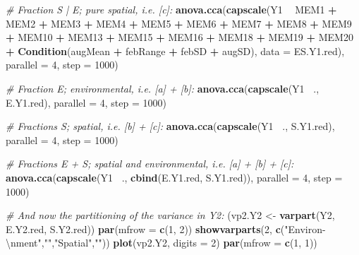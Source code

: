 \documentclass[10pt,A4,]{article}
\newenvironment{Shaded}{\begin{snugshade}}{\end{snugshade}}
\newcommand{\KeywordTok}[1]{\textcolor[rgb]{0.13,0.29,0.53}{\textbf{#1}}}
\newcommand{\DataTypeTok}[1]{\textcolor[rgb]{0.13,0.29,0.53}{#1}}
\newcommand{\DecValTok}[1]{\textcolor[rgb]{0.00,0.00,0.81}{#1}}
\newcommand{\CharTok}[1]{\textcolor[rgb]{0.31,0.60,0.02}{#1}}
\newcommand{\StringTok}[1]{\textcolor[rgb]{0.31,0.60,0.02}{#1}}
\newcommand{\CommentTok}[1]{\textcolor[rgb]{0.56,0.35,0.01}{\textit{#1}}}
\newcommand{\OperatorTok}[1]{\textcolor[rgb]{0.81,0.36,0.00}{\textbf{#1}}}
\newcommand{\NormalTok}[1]{#1}
\begin{document}
\begin{Shaded}
\begin{Highlighting}[]
\CommentTok{# Fraction S | E; pure spatial, i.e. [c]:}
\KeywordTok{anova.cca}\NormalTok{(}\KeywordTok{capscale}\NormalTok{(Y1 }\OperatorTok{~}\StringTok{ }\NormalTok{MEM1 }\OperatorTok{+}\StringTok{ }\NormalTok{MEM2 }\OperatorTok{+}\StringTok{ }\NormalTok{MEM3 }\OperatorTok{+}\StringTok{ }\NormalTok{MEM4 }\OperatorTok{+}\StringTok{ }\NormalTok{MEM5 }\OperatorTok{+}
\StringTok{                              }\NormalTok{MEM6 }\OperatorTok{+}\StringTok{ }\NormalTok{MEM7 }\OperatorTok{+}\StringTok{ }\NormalTok{MEM8 }\OperatorTok{+}\StringTok{ }\NormalTok{MEM9 }\OperatorTok{+}\StringTok{ }\NormalTok{MEM10 }\OperatorTok{+}
\StringTok{                              }\NormalTok{MEM13 }\OperatorTok{+}\StringTok{ }\NormalTok{MEM15 }\OperatorTok{+}\StringTok{ }\NormalTok{MEM16 }\OperatorTok{+}
\StringTok{                              }\NormalTok{MEM18 }\OperatorTok{+}\StringTok{ }\NormalTok{MEM19 }\OperatorTok{+}\StringTok{ }\NormalTok{MEM20 }\OperatorTok{+}
\StringTok{                  }\KeywordTok{Condition}\NormalTok{(augMean }\OperatorTok{+}\StringTok{ }\NormalTok{febRange }\OperatorTok{+}\StringTok{ }\NormalTok{febSD }\OperatorTok{+}\StringTok{ }\NormalTok{augSD),}
                \DataTypeTok{data =}\NormalTok{ ES.Y1.red), }\DataTypeTok{parallel =} \DecValTok{4}\NormalTok{, }\DataTypeTok{step =} \DecValTok{1000}\NormalTok{)}

\CommentTok{# Fraction E; environmental, i.e. [a] + [b]:}
\KeywordTok{anova.cca}\NormalTok{(}\KeywordTok{capscale}\NormalTok{(Y1 }\OperatorTok{~}\NormalTok{., E.Y1.red), }\DataTypeTok{parallel =} \DecValTok{4}\NormalTok{, }\DataTypeTok{step =} \DecValTok{1000}\NormalTok{)}

\CommentTok{# Fractions S; spatial, i.e. [b] + [c]:}
\KeywordTok{anova.cca}\NormalTok{(}\KeywordTok{capscale}\NormalTok{(Y1 }\OperatorTok{~}\NormalTok{., S.Y1.red), }\DataTypeTok{parallel =} \DecValTok{4}\NormalTok{, }\DataTypeTok{step =} \DecValTok{1000}\NormalTok{)}

\CommentTok{# Fractions E + S; spatial and environmental, i.e. [a] + [b] + [c]:}
\KeywordTok{anova.cca}\NormalTok{(}\KeywordTok{capscale}\NormalTok{(Y1 }\OperatorTok{~}\NormalTok{., }\KeywordTok{cbind}\NormalTok{(E.Y1.red, S.Y1.red)), }\DataTypeTok{parallel =} \DecValTok{4}\NormalTok{, }\DataTypeTok{step =} \DecValTok{1000}\NormalTok{)}

\CommentTok{# And now the partitioning of the variance in Y2:}
\NormalTok{(vp2.Y2 <-}\StringTok{ }\KeywordTok{varpart}\NormalTok{(Y2, E.Y2.red, S.Y2.red))}
\KeywordTok{par}\NormalTok{(}\DataTypeTok{mfrow =} \KeywordTok{c}\NormalTok{(}\DecValTok{1}\NormalTok{, }\DecValTok{2}\NormalTok{))}
\KeywordTok{showvarparts}\NormalTok{(}\DecValTok{2}\NormalTok{, }\KeywordTok{c}\NormalTok{(}\StringTok{"Environ-}\CharTok{\textbackslash{}n}\StringTok{ment"}\NormalTok{,}\StringTok{""}\NormalTok{,}\StringTok{"Spatial"}\NormalTok{,}\StringTok{""}\NormalTok{))}
\KeywordTok{plot}\NormalTok{(vp2.Y2, }\DataTypeTok{digits =} \DecValTok{2}\NormalTok{)}
\KeywordTok{par}\NormalTok{(}\DataTypeTok{mfrow =} \KeywordTok{c}\NormalTok{(}\DecValTok{1}\NormalTok{, }\DecValTok{1}\NormalTok{))}


\end{Highlighting}
\end{Shaded}
\end{document}
